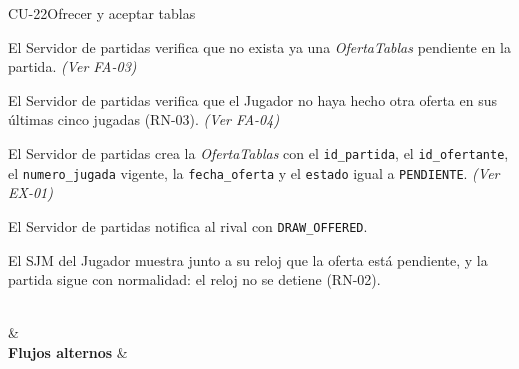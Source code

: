 \begin{fichacu}{CU-22}{Ofrecer y aceptar tablas}
{\begin{cuenum}[start=1]
      \item El Servidor de partidas verifica que no exista ya una \textit{OfertaTablas} pendiente en la partida. \textit{(Ver \mbox{FA-03})}
      \item El Servidor de partidas verifica que el Jugador no haya hecho otra oferta en sus últimas cinco jugadas (\mbox{RN-03}). \textit{(Ver \mbox{FA-04})}
      \item El Servidor de partidas crea la \textit{OfertaTablas} con el \texttt{id\_\allowbreak{}partida}, el \texttt{id\_\allowbreak{}ofertante}, el \texttt{numero\_\allowbreak{}jugada} vigente, la \texttt{fecha\_\allowbreak{}oferta} y el \texttt{estado} igual a \texttt{PENDIENTE}. \textit{(Ver \mbox{EX-01})}
      \item El Servidor de partidas notifica al rival con \texttt{DRAW\_\allowbreak{}OFFERED}.
      \item El SJM del Jugador muestra junto a su reloj que la oferta está pendiente, y la partida sigue con normalidad: el reloj no se detiene (\mbox{RN-02}).
    \end{cuenum}} \\
   &  \\ \hline
  \textbf{Flujos alternos} & 
\end{fichacu}
